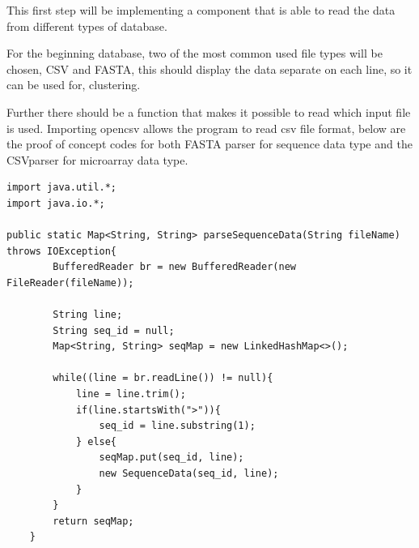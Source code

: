 \documentclass[]{final_report}
\begin{document}
This first step will be implementing a component that is able to read the data from different types of database.

For the beginning database, two of the most common used file types will be chosen, CSV and FASTA, this should display the data separate on each line, so it can be used for, clustering.

Further there should be a function that makes it possible to read which input file is used. Importing opencsv allows the program to read csv file format, below are the proof of concept codes for both FASTA parser for sequence data type and the CSVparser for microarray data type.

\label{FASTAparser}
\begin{verbatim} 
import java.util.*;
import java.io.*;

public static Map<String, String> parseSequenceData(String fileName) throws IOException{
        BufferedReader br = new BufferedReader(new FileReader(fileName));

        String line;
        String seq_id = null;
        Map<String, String> seqMap = new LinkedHashMap<>();

        while((line = br.readLine()) != null){
            line = line.trim();
            if(line.startsWith(">")){
                seq_id = line.substring(1);
            } else{
                seqMap.put(seq_id, line);
                new SequenceData(seq_id, line);
            }
        }
        return seqMap;
    }

\end{verbatim}
\end{document}
